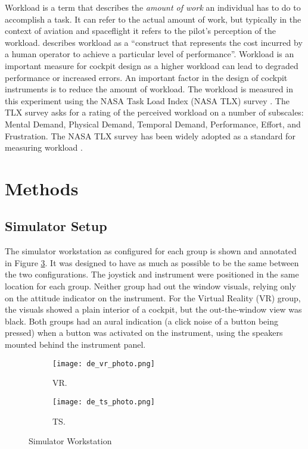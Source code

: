 Workload is a term that describes the \emph{amount of work} an individual has to do to accomplish a task.
It can refer to the actual amount of work, but typically in the context of aviation and spaceflight it refers to the pilot's perception of the workload.
\citet{hart_development_1988} describes workload as a ``construct that represents the cost incurred by a human operator to achieve a particular level of performance''.
Workload is an important measure for cockpit design as a higher workload can lead to degraded performance or increased errors.
An important factor in the design of cockpit instruments is to reduce the amount of workload.
The workload is measured in this experiment using the NASA Task Load Index (NASA TLX) survey \citep{hart_development_1988}.
The TLX survey asks for a rating of the perceived workload on a number of subscales: Mental Demand, Physical Demand, Temporal Demand, Performance, Effort, and Frustration.
The NASA TLX survey has been widely adopted as a standard for measuring workload \citep{hart_nasa-task_2006}.

\section{Methods}

\subsection{Simulator Setup}

The simulator workstation as configured for each group is shown and annotated in Figure \ref{fig:de_simgroups}.
It was designed to have as much as possible to be the same between the two configurations.
The joystick and instrument were positioned in the same location for each group.
Neither group had out the window visuals, relying only on the attitude indicator on the instrument.
For the Virtual Reality (VR) group, the visuals showed a plain interior of a cockpit, but the out-the-window view was black.
Both groups had an aural indication (a click noise of a button being pressed) when a button was activated on the instrument, using the speakers mounted behind the instrument panel.

\begin{figure}
    \centering
    \begin{subfigure}[t]{0.49\linewidth}
        \centering
        \texttt{[image: de\_vr\_photo.png]}
        \caption{VR.}
        \label{fig:de_simgroups:vr}
    \end{subfigure}
    \begin{subfigure}[t]{0.49\linewidth}
        \centering
        \texttt{[image: de\_ts\_photo.png]}
        \caption{TS.}
        \label{fig:de_simgroups:ts}
    \end{subfigure}
    \caption{Simulator Workstation}
    \label{fig:de_simgroups}
\end{figure}

